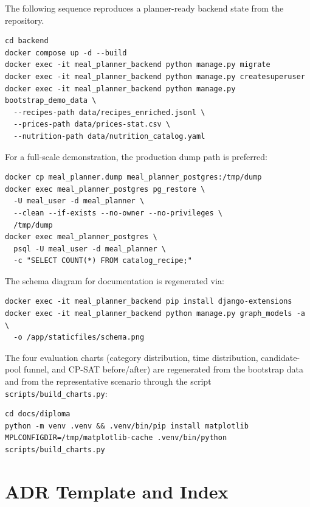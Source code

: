 The following sequence reproduces a planner-ready backend state from the repository.

\begin{lstlisting}[caption={End-to-end bootstrap from versioned data files.}]
cd backend
docker compose up -d --build
docker exec -it meal_planner_backend python manage.py migrate
docker exec -it meal_planner_backend python manage.py createsuperuser
docker exec -it meal_planner_backend python manage.py bootstrap_demo_data \
  --recipes-path data/recipes_enriched.jsonl \
  --prices-path data/prices-stat.csv \
  --nutrition-path data/nutrition_catalog.yaml
\end{lstlisting}

For a full-scale demonstration, the production dump path is preferred:

\begin{lstlisting}[caption={Full-scale corpus restore from the production-shaped dump.}]
docker cp meal_planner.dump meal_planner_postgres:/tmp/dump
docker exec meal_planner_postgres pg_restore \
  -U meal_user -d meal_planner \
  --clean --if-exists --no-owner --no-privileges \
  /tmp/dump
docker exec meal_planner_postgres \
  psql -U meal_user -d meal_planner \
  -c "SELECT COUNT(*) FROM catalog_recipe;"
\end{lstlisting}

The schema diagram for documentation is regenerated via:

\begin{lstlisting}[caption={Regenerate the ER diagram for documentation.}]
docker exec -it meal_planner_backend pip install django-extensions
docker exec -it meal_planner_backend python manage.py graph_models -a \
  -o /app/staticfiles/schema.png
\end{lstlisting}

The four evaluation charts (category distribution, time distribution, candidate-pool funnel, and CP-SAT before/after) are regenerated from the bootstrap data and from the representative scenario through the script \texttt{scripts/build\_charts.py}:

\begin{lstlisting}[caption={Regenerate the evaluation charts.}]
cd docs/diploma
python -m venv .venv && .venv/bin/pip install matplotlib
MPLCONFIGDIR=/tmp/matplotlib-cache .venv/bin/python scripts/build_charts.py
\end{lstlisting}

\clearpage


\chapter{ADR Template and Index}
\label{app:adr}

